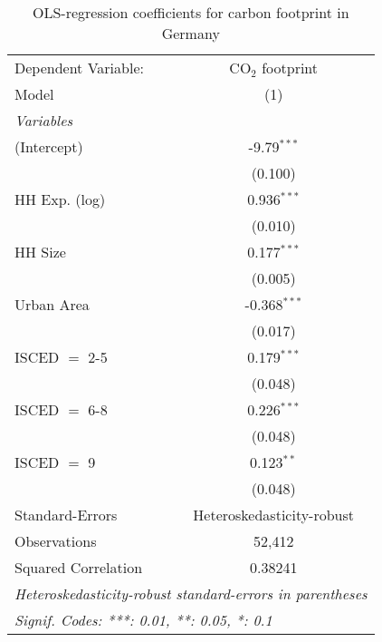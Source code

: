 
\begin{table}[htbp!]
   \centering
   \small
   \begin{adjustbox}{width = 1\textwidth, max height = 0.95\textheight, center}
      \begin{threeparttable}[b]
         \caption{\label{tab:OLS_2_DEU} OLS-regression coefficients for carbon footprint in Germany}
         \begin{tabular}{lc}
            \tabularnewline \midrule \midrule
            Dependent Variable: & CO$_{2}$ footprint\\  
            Model               & (1)\\  
            \midrule
            \emph{Variables}\\
            (Intercept)         & -9.79$^{***}$\\   
                                & (0.100)\\   
            HH Exp. (log)       & 0.936$^{***}$\\   
                                & (0.010)\\   
            HH Size             & 0.177$^{***}$\\   
                                & (0.005)\\   
            Urban Area          & -0.368$^{***}$\\   
                                & (0.017)\\   
            ISCED $=$ 2-5       & 0.179$^{***}$\\   
                                & (0.048)\\   
            ISCED $=$ 6-8       & 0.226$^{***}$\\   
                                & (0.048)\\   
            ISCED $=$ 9         & 0.123$^{**}$\\   
                                & (0.048)\\   
            \midrule 
            Standard-Errors     & Heteroskedasticity-robust \\   
            Observations        & 52,412\\  
            Squared Correlation & 0.38241\\  
            \midrule \midrule
            \multicolumn{2}{l}{\emph{Heteroskedasticity-robust standard-errors in parentheses}}\\
            \multicolumn{2}{l}{\emph{Signif. Codes: ***: 0.01, **: 0.05, *: 0.1}}\\
         \end{tabular}
         

\end{threeparttable}
\end{adjustbox}
\end{table}
